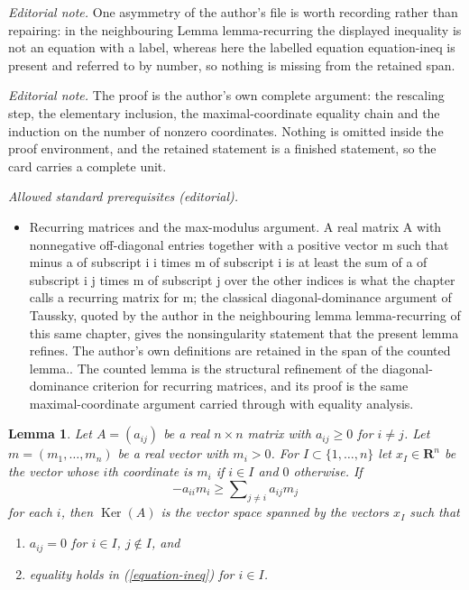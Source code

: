 \documentclass[10pt,a4paper]{amsart}
\theoremstyle{plain}
\newtheorem{lemma}[subsection]{Lemma}
\theoremstyle{definition}
\theoremstyle{remark}
\numberwithin{equation}{subsection}
\def\Ker{\mathop{\mathrm{Ker}}}
\begin{document}
\noindent\textit{Editorial note.} One asymmetry of the author's file is worth recording rather than repairing: in the neighbouring Lemma lemma-recurring the displayed inequality is not an equation with a label, whereas here the labelled equation equation-ineq is present and referred to by number, so nothing is missing from the retained span.\par\medskip
\noindent\textit{Editorial note.} The proof is the author's own complete argument: the rescaling step, the elementary inclusion, the maximal-coordinate equality chain and the induction on the number of nonzero coordinates. Nothing is omitted inside the proof environment, and the retained statement is a finished statement, so the card carries a complete unit.\par\medskip
\noindent\textit{Allowed standard prerequisites (editorial).}\begin{itemize}
\item Recurring matrices and the max-modulus argument. A real matrix A with nonnegative off-diagonal entries together with a positive vector m such that minus a of subscript i i times m of subscript i is at least the sum of a of subscript i j times m of subscript j over the other indices is what the chapter calls a recurring matrix for m; the classical diagonal-dominance argument of Taussky, quoted by the author in the neighbouring lemma lemma-recurring of this same chapter, gives the nonsingularity statement that the present lemma refines. The author's own definitions are retained in the span of the counted lemma.. The counted lemma is the structural refinement of the diagonal-dominance criterion for recurring matrices, and its proof is the same maximal-coordinate argument carried through with equality analysis.
\end{itemize}\medskip
\begin{lemma}
\label{lemma-recurring-real}
Let $A = (a_{ij})$ be a real $n \times n$ matrix with
$a_{ij} \geq 0$ for $i \not = j$. Let $m = (m_1, \ldots, m_n)$ be a real
vector with $m_i > 0$. For $I \subset \{1, \ldots, n\}$ let
$x_I \in \mathbf{R}^n$
be the vector whose $i$th coordinate is $m_i$ if $i \in I$
and $0$ otherwise. If
\begin{equation}
\label{equation-ineq}
-a_{ii}m_i \geq \sum\nolimits_{j \not = i} a_{ij}m_j
\end{equation}
for each $i$, then $\Ker(A)$ is the vector space
spanned by the vectors $x_I$ such that
\begin{enumerate}
\item $a_{ij} = 0$ for $i \in I$, $j \not \in I$, and
\item equality holds in (\ref{equation-ineq}) for $i \in I$.
\end{enumerate}
\end{lemma}
\end{document}
